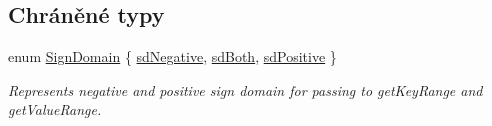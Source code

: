 \subsection*{Chráněné typy}
\begin{DoxyCompactItemize}
\item 
enum \hyperlink{classQCPAbstractPlottable_a661743478a1d3c09d28ec2711d7653d8}{Sign\+Domain} \{ \hyperlink{classQCPAbstractPlottable_a661743478a1d3c09d28ec2711d7653d8a0fc9a70796ef60ad18ddd18056e6dc63}{sd\+Negative}, 
\hyperlink{classQCPAbstractPlottable_a661743478a1d3c09d28ec2711d7653d8a082b98cfb91a7363a3b5cd17b0c1cd60}{sd\+Both}, 
\hyperlink{classQCPAbstractPlottable_a661743478a1d3c09d28ec2711d7653d8a02951859f243a4d24e779cfbb5471030}{sd\+Positive}
 \}\begin{DoxyCompactList}\small\item\em Represents negative and positive sign domain for passing to get\+Key\+Range and get\+Value\+Range. \end{DoxyCompactList}
\end{DoxyCompactItemize}
